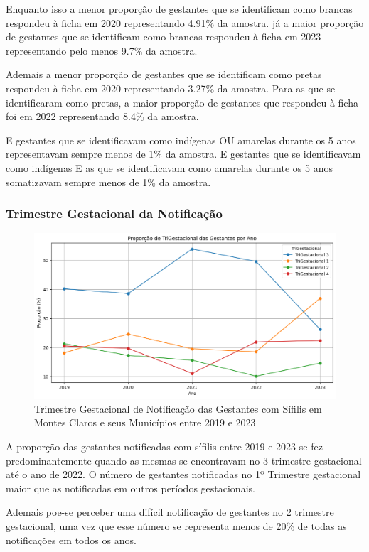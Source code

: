 \documentclass[a4paper]{article}
\begin{document}
\begin{multicols}
    Enquanto isso a menor proporção de gestantes que se identificam como brancas respondeu à ficha em 2020 representando 4.91\% da amostra.
    já a maior proporção de gestantes que se identificam como brancas respondeu à ficha em 2023 representando pelo menos 9.7\% da amostra.
    
    Ademais a menor proporção de gestantes que se identificam como pretas respondeu à ficha em 2020 representando 3.27\% da amostra.
    Para as que se identificaram como pretas, a maior proporção de gestantes que respondeu à ficha foi em 2022 representando 8.4\% da amostra.

    E gestantes que se identificavam como indígenas OU amarelas durante os 5 anos representavam sempre menos de 1\% da amostra.
    E gestantes que se identificavam como indígenas E as que se identificavam como amarelas durante os 5 anos somatizavam sempre menos de 1\% da amostra.

\subsubsection{Trimestre Gestacional da Notificação}
\begin{figure}[h!]
    \centering
    \includegraphics[width=0.7\linewidth]{imagens/TriGestacional.png}
    \caption{Trimestre Gestacional de Notificação das Gestantes com Sífilis em Montes Claros e seus Municípios entre 2019 e 2023}
    \label{fig:enter-label}
\end{figure}
 A proporção das gestantes notificadas com sífilis entre 2019 e 2023 se fez predominantemente quando as mesmas se encontravam no 3 trimestre gestacional até o ano de 2022. O número de gestantes notificadas no 1º Trimestre gestacional maior que as notificadas em outros períodos gestacionais.

Ademais poe-se perceber uma difícil notificação de gestantes no 2 trimestre gestacional, uma vez que esse número se representa menos de 20\% de todas as notificações em todos os anos.


\end{multicols}
\end{document}
